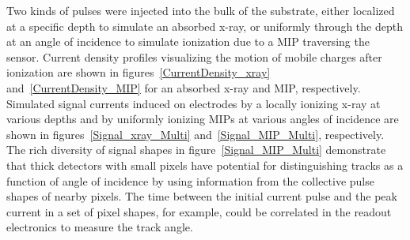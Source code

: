 Two kinds of pulses were injected into the bulk of the substrate, either localized at a specific depth to simulate an absorbed x-ray, or uniformly through the depth at an angle of incidence to simulate ionization due to a MIP traversing the sensor.
Current density profiles visualizing the motion of mobile charges after ionization are shown in figures~\ref{CurrentDensity_xray} and~\ref{CurrentDensity_MIP} for an absorbed x-ray and MIP, respectively.
Simulated signal currents induced on electrodes by a locally ionizing x-ray at various depths and by uniformly ionizing MIPs at various angles of incidence are shown in figures~\ref{Signal_xray_Multi} and~\ref{Signal_MIP_Multi}, respectively.
The rich diversity of signal shapes in figure~\ref{Signal_MIP_Multi} demonstrate that thick detectors with small pixels have potential for distinguishing tracks as a function of angle of incidence by using information from the collective pulse shapes of nearby pixels. 
The time between the initial current pulse and the peak current in a set of pixel shapes, for example, could be correlated in the readout electronics to measure the track angle.

